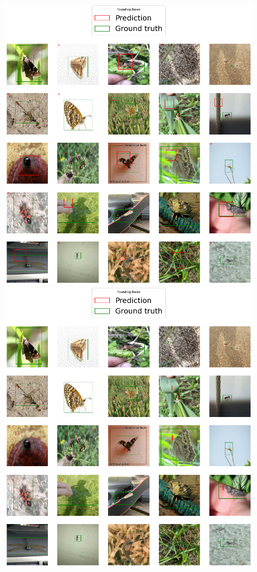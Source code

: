 \begin{figure}
\begin{multicols}{2}
\begin{minipage}{.45\textwidth}
            \includegraphics[width=\textwidth]{images/regression-vgg.png}
        \end{minipage}
        \columnbreak
        \begin{minipage}{.45\textwidth}
            \includegraphics[width=\textwidth]{images/augmented-regression-vgg.png}

\end{minipage}
\end{multicols}
\end{figure}
